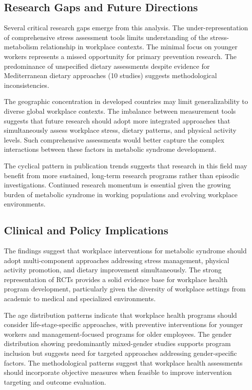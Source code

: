 \subsection{Research Gaps and Future Directions}
Several critical research gaps emerge from this analysis. The under-representation of comprehensive stress assessment tools limits understanding of the stress-metabolism relationship in workplace contexts. The minimal focus on younger workers represents a missed opportunity for primary prevention research. The predominance of unspecified dietary assessments despite evidence for Mediterranean dietary approaches (10 studies) suggests methodological inconsistencies.\par
The geographic concentration in developed countries may limit generalizability to diverse global workplace contexts. The imbalance between measurement tools suggests that future research should adopt more integrated approaches that simultaneously assess workplace stress, dietary patterns, and physical activity levels. Such comprehensive assessments would better capture the complex interactions between these factors in metabolic syndrome development.\par
The cyclical pattern in publication trends suggests that research in this field may benefit from more sustained, long-term research programs rather than episodic investigations. Continued research momentum is essential given the growing burden of metabolic syndrome in working populations and evolving workplace environments.

\subsection{Clinical and Policy Implications}
The findings suggest that workplace interventions for metabolic syndrome should adopt multi-component approaches addressing stress management, physical activity promotion, and dietary improvement simultaneously. The strong representation of RCTs provides a solid evidence base for workplace health program development, particularly given the diversity of workplace settings from academic to medical and specialized environments.\par
The age distribution patterns indicate that workplace health programs should consider life-stage-specific approaches, with preventive interventions for younger workers and management-focused programs for older employees. The gender distribution showing predominantly mixed-gender studies supports program inclusion but suggests need for targeted approaches addressing gender-specific factors. The methodological patterns suggest that workplace health assessments should incorporate objective measures when feasible to improve intervention targeting and outcome evaluation.